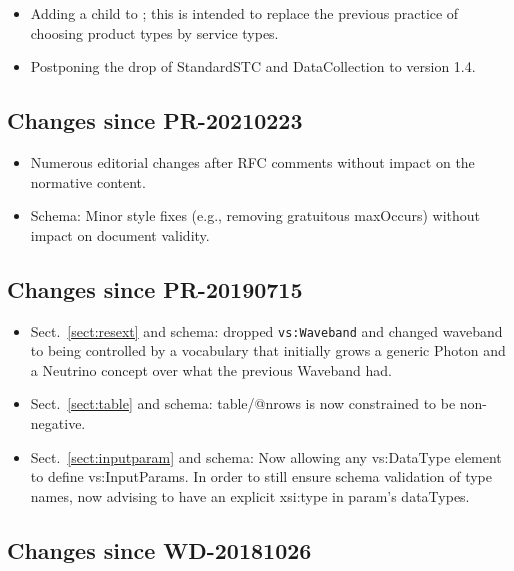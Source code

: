 \documentclass[11pt,a4paper]{ivoa}
\begin{document}
\begin{itemize}
\item Adding a  child to ;
this is intended to replace the previous practice of choosing product
types by service types.
\item Postponing the drop of StandardSTC and DataCollection to version
1.4.
\end{itemize}

\subsection{Changes since PR-20210223}

\begin{itemize}
\item Numerous editorial changes after RFC comments without
impact on the normative content.
\item Schema: Minor style fixes (e.g., removing gratuitous maxOccurs)
without impact on document validity.
\end{itemize}

\subsection{Changes since PR-20190715}

\begin{itemize}
\item Sect.~\ref{sect:resext} and schema:
dropped \verb|vs:Waveband| and changed waveband to being
controlled by a vocabulary that initially grows a generic Photon and a
Neutrino concept over what the previous Waveband had.
\item Sect.~\ref{sect:table} and schema: table/@nrows is now constrained to be non-negative.
\item Sect.~\ref{sect:inputparam} and schema:
Now allowing any vs:DataType element to define vs:InputParams.
In order to still ensure schema validation of type names,
now advising to have an explicit xsi:type in param's dataTypes.
\end{itemize}

\subsection{Changes since  WD-20181026}
\end{document}

